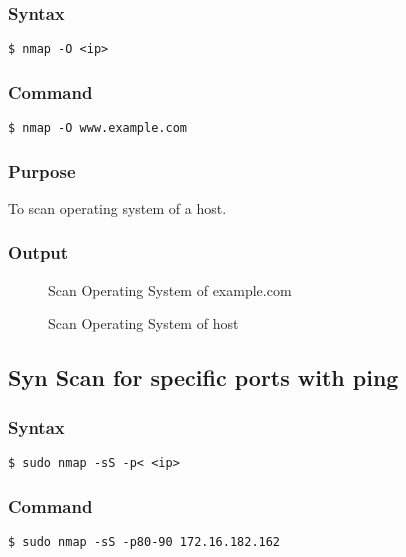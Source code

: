 \documentclass[11pt]{article}
\begin{document}
\subsubsection{Syntax}
\begin{verbatim}
$ nmap -O <ip>
\end{verbatim}

\subsubsection*{Command}
\begin{verbatim}
$ nmap -O www.example.com
\end{verbatim}

\subsubsection*{Purpose}
To scan operating system of a host.

\subsubsection*{Output}
\begin{figure}[H]
    \centering
    \caption{Scan Operating System of example.com}
    \label{fig:1}
\end{figure}

\begin{figure}[H]
    \centering
    \caption{Scan Operating System of host}
    \label{fig:1}
\end{figure}

\subsection{Syn Scan for specific ports with ping}
\subsubsection{Syntax}
\begin{verbatim}
$ sudo nmap -sS -p< <ip>
\end{verbatim}

\subsubsection*{Command}
\begin{verbatim}
$ sudo nmap -sS -p80-90 172.16.182.162
\end{verbatim}
\end{document}
